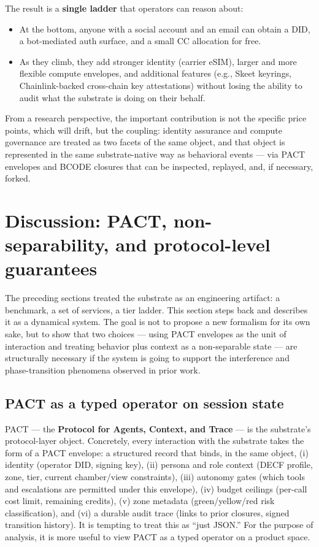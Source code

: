 The result is a \textbf{single ladder} that operators can reason about:

\begin{itemize}
\tightlist
\item
  At the bottom, anyone with a social account and an email can obtain a
  DID, a bot-mediated auth surface, and a small CC allocation for free.
\item
  As they climb, they add stronger identity (carrier eSIM), larger and
  more flexible compute envelopes, and additional features (e.g., Skeet
  keyrings, Chainlink-backed cross-chain key attestations) without
  losing the ability to audit what the substrate is doing on their
  behalf.
\end{itemize}

From a research perspective, the important contribution is not the
specific price points, which will drift, but the coupling: identity
assurance and compute governance are treated as two facets of the same
object, and that object is represented in the same substrate-native way
as behavioral events --- via PACT envelopes and BCODE closures that can
be inspected, replayed, and, if necessary, forked.

\section{Discussion: PACT, non-separability, and protocol-level
guarantees}\label{discussion-pact-non-separability-and-protocol-level-guarantees}

The preceding sections treated the substrate as an engineering artifact:
a benchmark, a set of services, a tier ladder. This section steps back
and describes it as a dynamical system. The goal is not to propose a new
formalism for its own sake, but to show that two choices --- using PACT
envelopes as the unit of interaction and treating behavior plus context
as a non-separable state --- are structurally necessary if the system is
going to support the interference and phase-transition phenomena
observed in prior work.

\subsection{PACT as a typed operator on session
state}\label{pact-as-a-typed-operator-on-session-state}

PACT --- the \textbf{Protocol for Agents, Context, and Trace} --- is the
substrate's protocol-layer object. Concretely, every interaction with
the substrate takes the form of a PACT envelope: a structured record
that binds, in the same object, (i) identity (operator DID, signing
key), (ii) persona and role context (DECF profile, zone, tier, current
chamber/view constraints), (iii) autonomy gates (which tools and
escalations are permitted under this envelope), (iv) budget ceilings
(per-call cost limit, remaining credits), (v) zone metadata
(green/yellow/red risk classification), and (vi) a durable audit trace
(links to prior closures, signed transition history). It is tempting to
treat this as ``just JSON.'' For the purpose of analysis, it is more
useful to view PACT as a typed operator on a product space.

